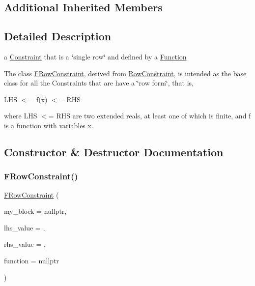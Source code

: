 \subsection*{Additional Inherited Members}


\subsection{Detailed Description}
a \mbox{\hyperlink{class_s_m_spp__di__unipi__it_1_1_constraint}{Constraint}} that is a \char`\"{}single row\char`\"{} and defined by a \mbox{\hyperlink{class_s_m_spp__di__unipi__it_1_1_function}{Function}} 

The class \mbox{\hyperlink{class_s_m_spp__di__unipi__it_1_1_f_row_constraint}{F\+Row\+Constraint}}, derived from \mbox{\hyperlink{class_s_m_spp__di__unipi__it_1_1_row_constraint}{Row\+Constraint}}, is intended as the base class for all the Constraints that are have a \char`\"{}row
form\char`\"{}, that is,

L\+HS $<$= f(x) $<$= R\+HS

where L\+HS $<$= R\+HS are two extended reals, at least one of which is finite, and f is a function with variables x. 

\subsection{Constructor \& Destructor Documentation}
\mbox{\label{class_s_m_spp__di__unipi__it_1_1_f_row_constraint_a7c8c828e00f88dc358bd8a9d83bab5c5}} 
\subsubsection{\texorpdfstring{F\+Row\+Constraint()}{FRowConstraint()}}
{\footnotesize\ttfamily \mbox{\hyperlink{class_s_m_spp__di__unipi__it_1_1_f_row_constraint}{F\+Row\+Constraint}} (\begin{DoxyParamCaption}\item[{\mbox{\hyperlink{class_s_m_spp__di__unipi__it_1_1_block}{Block}} $\ast$}]{my\+\_\+block = {\ttfamily nullptr},  }\item[{\mbox{\hyperlink{class_s_m_spp__di__unipi__it_1_1_row_constraint_a34abd4b01d3a2024be5f6d13dd88779f}{c\+\_\+\+R\+H\+S\+Value}}}]{lhs\+\_\+value = {},  }\item[{\mbox{\hyperlink{class_s_m_spp__di__unipi__it_1_1_row_constraint_a34abd4b01d3a2024be5f6d13dd88779f}{c\+\_\+\+R\+H\+S\+Value}}}]{rhs\+\_\+value = {},  }\item[{\mbox{\hyperlink{class_s_m_spp__di__unipi__it_1_1_function}{Function}} $\ast$const}]{function = {\ttfamily nullptr} }\end{DoxyParamCaption})\hspace{0.3cm}{\ttfamily [inline]}}



